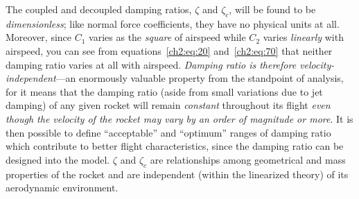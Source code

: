 The coupled and decoupled damping ratios, $\zeta$ and $\zeta_c$, will be
found to be \emph{dimensionless}; like normal force coefficients, they have
no physical units at all. Moreover, since $C_1$ varies as the \emph{square}
of airspeed while $C_2$ varies \emph{linearly} with airspeed, you can see
from equations~\eqref{ch2:eq:20} and~\eqref{ch2:eq:70} that neither damping
ratio varies at all with airspeed. \emph{Damping ratio is therefore
velocity-independent}---an enormously valuable property from the standpoint
of analysis, for it means that the damping ratio (aside from small
variations due to jet damping) of any given rocket will remain
\emph{constant} throughout its flight \emph{even though the velocity of the
rocket may vary by an order of magnitude or more}. It is then possible to
define ``acceptable'' and ``optimum'' ranges of damping ratio which
contribute to better flight characteristics, since the damping ratio can be
designed into the model. $\zeta$ and $\zeta_c$ are relationships among
geometrical and mass properties of the rocket and are independent (within
the linearized theory) of its aerodynamic environment.
